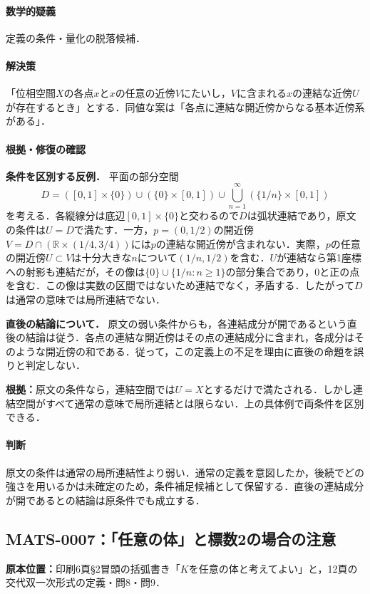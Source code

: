 \documentclass[a4paper,10pt]{ltjsarticle}
\begin{document}
\paragraph{数学的疑義}定義の条件・量化の脱落候補．

\paragraph{解決策}「位相空間$X$の各点$x$と$x$の任意の近傍$V$にたいし，$V$に含まれる$x$の連結な近傍$U$が存在するとき」とする．同値な案は「各点に連結な開近傍からなる基本近傍系がある」．

\paragraph{根拠・修復の確認}\par\textbf{条件を区別する反例．}
平面の部分空間
\[
D=([0,1]\times\{0\})\cup(\{0\}\times[0,1])
 \cup\bigcup_{n=1}^{\infty}(\{1/n\}\times[0,1])
\]
を考える．各縦線分は底辺$[0,1]\times\{0\}$と交わるので$D$は弧状連結であり，原文の条件は$U=D$で満たす．一方，$p=(0,1/2)$の開近傍$V=D\cap(\mathbb R\times(1/4,3/4))$には$p$の連結な開近傍が含まれない．実際，$p$の任意の開近傍$U\subset V$は十分大きな$n$について$(1/n,1/2)$を含む．$U$が連結なら第1座標への射影も連結だが，その像は$\{0\}\cup\{1/n:n\ge1\}$の部分集合であり，$0$と正の点を含む．この像は実数の区間ではないため連結でなく，矛盾する．したがって$D$は通常の意味では局所連結でない．
\par\textbf{直後の結論について．}
原文の弱い条件からも，各連結成分が開であるという直後の結論は従う．各点の連結な開近傍はその点の連結成分に含まれ，各成分はそのような開近傍の和である．従って，この定義上の不足を理由に直後の命題を誤りと判定しない．

\textbf{根拠：}原文の条件なら，連結空間では$U=X$とするだけで満たされる．しかし連結空間がすべて通常の意味で局所連結とは限らない．上の具体例で両条件を区別できる．

\paragraph{判断}原文の条件は通常の局所連結性より弱い．通常の定義を意図したか，後続でどの強さを用いるかは未確定のため，条件補足候補として保留する．直後の連結成分が開であるとの結論は原条件でも成立する．


\subsection*{MATS-0007：「任意の体」と標数2の場合の注意}\label{math:MATS-0007}
\noindent\textbf{原本位置：}印刷6頁\S2冒頭の括弧書き「$K$を任意の体と考えてよい」と，12頁の交代双一次形式の定義・問8・問9．
\end{document}

